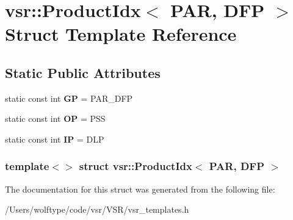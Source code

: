 \hypertarget{structvsr_1_1_product_idx_3_01_p_a_r_00_01_d_f_p_01_4}{\section{vsr\-:\-:Product\-Idx$<$ P\-A\-R, D\-F\-P $>$ Struct Template Reference}
\label{structvsr_1_1_product_idx_3_01_p_a_r_00_01_d_f_p_01_4}
}
\subsection*{Static Public Attributes}
\begin{DoxyCompactItemize}
\item 
\hypertarget{structvsr_1_1_product_idx_3_01_p_a_r_00_01_d_f_p_01_4_a35ed983552be69d9276221fb23b788b3}{static const int {\bfseries G\-P} = P\-A\-R\-\_\-\-D\-F\-P}\label{structvsr_1_1_product_idx_3_01_p_a_r_00_01_d_f_p_01_4_a35ed983552be69d9276221fb23b788b3}

\item 
\hypertarget{structvsr_1_1_product_idx_3_01_p_a_r_00_01_d_f_p_01_4_ab4ae688faeda6031fec1b59ce10190bb}{static const int {\bfseries O\-P} = P\-S\-S}\label{structvsr_1_1_product_idx_3_01_p_a_r_00_01_d_f_p_01_4_ab4ae688faeda6031fec1b59ce10190bb}

\item 
\hypertarget{structvsr_1_1_product_idx_3_01_p_a_r_00_01_d_f_p_01_4_aa671b5797a71b7aed0d9f4c7484342de}{static const int {\bfseries I\-P} = D\-L\-P}\label{structvsr_1_1_product_idx_3_01_p_a_r_00_01_d_f_p_01_4_aa671b5797a71b7aed0d9f4c7484342de}

\end{DoxyCompactItemize}
\subsubsection*{template$<$$>$ struct vsr\-::\-Product\-Idx$<$ P\-A\-R, D\-F\-P $>$}



The documentation for this struct was generated from the following file\-:\begin{DoxyCompactItemize}
\item 
/\-Users/wolftype/code/vsr/\-V\-S\-R/vsr\-\_\-templates.\-h\end{DoxyCompactItemize}
